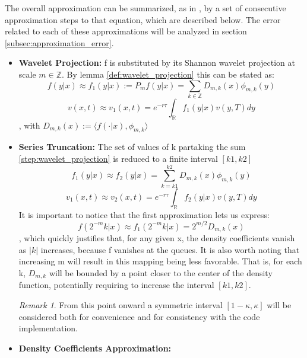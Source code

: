 \documentclass[12,twoside]{mammeTFM}
\theoremstyle{definition}
\theoremstyle{remark}
\newtheorem{remark}[thm]{Remark}
\newcommand{\Z}{\ensuremath{\mathbb{Z}}}
\newcommand{\R}{\ensuremath{\mathbb{R}}}
\begin{document}
The overall approximation can be summarized, as in \cite{mar17}, by a set of consecutive approximation steps to that equation, which are described below. The error related to each of these approximations will be analyzed in section \ref{subsec:approximation_error}.

\begin{itemize} \label{swift_steps}

\item \textbf{Wavelet Projection:} f is substituted by its Shannon wavelet projection at scale $m \in \Z$. By lemma \ref{def:wavelet_projection} this can be stated as:
\begin{equation} \label{step:wavelet_projection}
f(y|x) \approx f_1(y|x) := P_mf(y|x) = \sum_{k \in \Z} D_{m,k}(x) \phi_{m,k}(y)
\end{equation}
\begin{equation}
v(x,t) \approx v_1(x,t) = e^{-r \tau} \int_{\R} f_1(y|x)v(y, T)dy
\end{equation}
, with $D_{m,k}(x):=\langle f(\cdot | x), \phi_{m,k} \rangle$
\item \textbf{Series Truncation: } The set of values of k partaking the sum \ref{step:wavelet_projection} is reduced to a finite interval $[k1, k2]$
\begin{equation}
f_1(y|x) \approx f_2(y|x) = \sum_{k = k1}^{k2} D_{m,k}(x)\phi_{m,k}(y)
\end{equation}
\begin{equation} \label{step:series_truncation}
v_1(x,t) \approx v_2(x,t) = e^{-r \tau} \int_{\R} f_2(y|x)v(y, T)dy
\end{equation}
It is important to notice that the first approximation lets us express: 
\begin{equation}
f(2^{-m}k|x) \approx f_1(2^{-m}k|x) = 2^{m/2} D_{m,k}(x)
\end{equation}
, which quickly justifies that, for any given x, the density coefficients vanish as $|k|$ increases, because f vanishes at the queues. It is also worth noting that increasing m will result in this mapping being less favorable. That is, for each k, $D_{m,k}$ will be bounded by a point closer to the center of the density function, potentially requiring to increase the interval $[k1, k2]$.
\begin{remark}
From this point onward a symmetric interval $[1 - \kappa, \kappa]$ will be considered both for convenience and for consistency with the code implementation.
\end{remark}
\item \textbf{Density Coefficients Approximation: }

\end{itemize}
\end{document}
